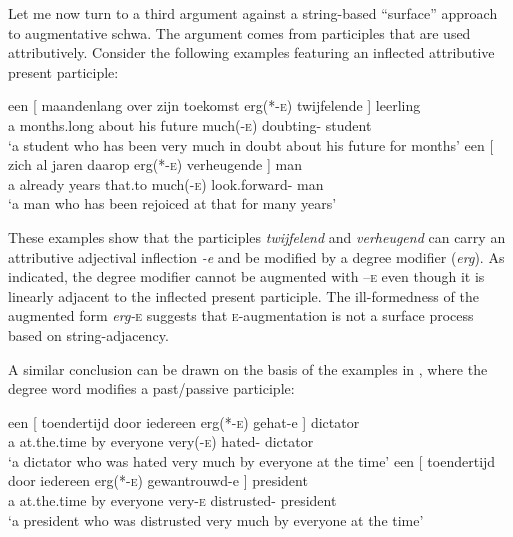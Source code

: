 \documentclass[output=paper]{langsci/langscibook}
\begin{document}
Let me now turn to a third argument against a string-based “surface” approach
to augmentative schwa. The argument comes from participles that are used
attributively. Consider the following examples featuring an inflected
attributive present participle:\newpage

\ea%
    \label{ex:key:18.24}
	\ea
	\gll een [ maandenlang  over    zijn  toekomst    erg(*\textsc{-e})      twijfelende ]      leerling\\
    a  {}    months.long      about  his    future        much(\textsc{-e})    doubting-\Agr{} {} student\\
	\glt \enquote*{a student who has been very much in doubt about his future for months}
	\ex
	\gll een  [ zich  al            jaren    daarop    erg(*\textsc{-e})    verheugende ]          man\\
    a {} \Refl{}  already  years    that.to      much(-\textsc{e})    look.forward-\Agr{} {} man\\
	\glt \enquote*{a man who has been rejoiced at that for many years}
	\z
\z

These examples show that the participles \emph{twijfelend} and
\emph{verheugend} can carry an attributive adjectival inflection \emph{-e} and
be modified by a degree modifier (\emph{erg}). As indicated, the degree
modifier cannot be augmented with –\textsc{e} even though it is linearly
adjacent to the inflected present participle. The ill-formedness of the
augmented form \emph{erg-}\textsc{e} suggests that \textsc{e}-augmentation is
not a surface process based on string-adjacency.

A similar conclusion can be drawn on the basis of the examples in
, where the degree word modifies a past/passive participle:

\ea%
    \label{ex:key:18.25}
	\ea
	\gll een [ toendertijd    door    iedereen    erg(*-\textsc{e})    gehat-e ]        dictator\\
        a  {} at.the.time        by        everyone    very(-\textsc{e})      hated-\Agr{} {}   dictator\\
	\glt ‘a dictator who was hated very much by everyone at the time’
	\ex
	\gll een [ toendertijd    door    iedereen    erg(*-\textsc{e})    gewantrouwd-e ]    president\\
    a   {}   at.the.time        by        everyone    very-\textsc{e}        distrusted-\Agr{} {}     president\\
	\glt \enquote*{a president who was distrusted very much by everyone at the time}
	\z
\z
\end{document}
